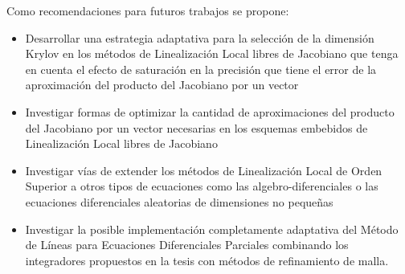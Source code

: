 \begin{recomendations}

Como recomendaciones para futuros trabajos se propone:
\begin{itemize}
	\item Desarrollar una estrategia adaptativa para la selección de la dimensión Krylov en los métodos de Linealización Local libres de Jacobiano que tenga en cuenta el efecto de saturación en la precisión que tiene el error de la aproximación del producto del Jacobiano por un vector
	\item Investigar formas de optimizar la cantidad de aproximaciones del producto del Jacobiano por un vector necesarias en los esquemas embebidos de Linealización Local libres de Jacobiano
	\item Investigar vías de extender los métodos de Linealización Local de Orden Superior a otros tipos de ecuaciones como las algebro-diferenciales o las ecuaciones diferenciales aleatorias de dimensiones no pequeñas
	\item Investigar la posible implementación completamente adaptativa del Método de Líneas para Ecuaciones Diferenciales Parciales combinando los integradores propuestos en la tesis con métodos de refinamiento de malla.
\end{itemize}

\end{recomendations}
